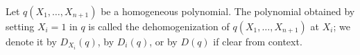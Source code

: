 Let $q(X_1, \ldots, X_{n+1})$ be a homogeneous polynomial. The polynomial obtained by setting $X_i = 1$ in $q$ is called the dehomogenization of $q(X_1, \ldots, X_{n+1})$ at $X_i$; we denote it by $D_{X_i}(q)$, by $D_i(q)$, or by $D(q)$ if clear from context.
